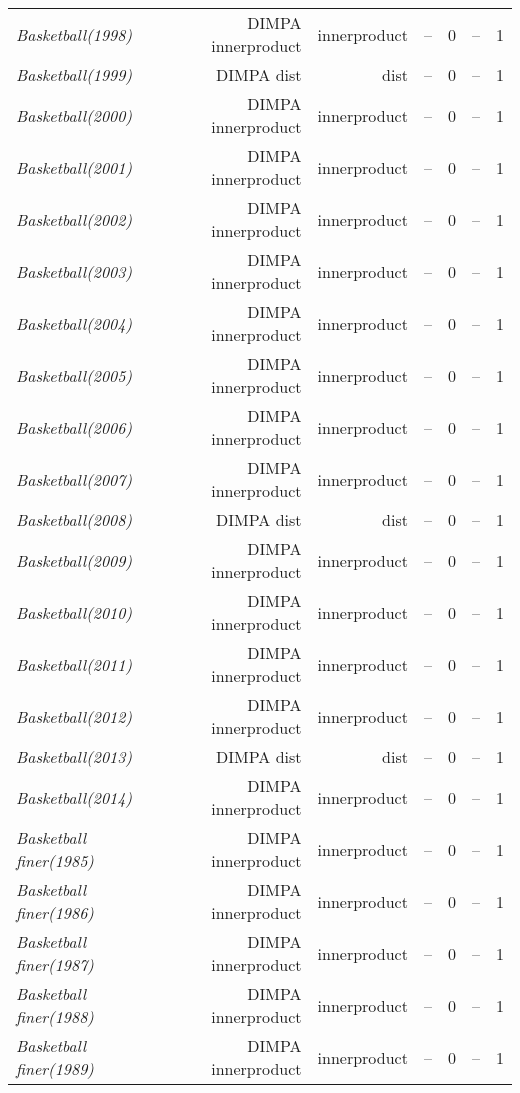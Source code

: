 \documentclass[nohyperref]{article}
\theoremstyle{plain}
\theoremstyle{definition}
\theoremstyle{remark}
\begin{document}
\begin{table*}[!ht]
{\begin{tabular}{lrrrrrr}
			{\it Basketball(1998)} & DIMPA innerproduct & innerproduct & -- & 0 & -- & 1 \\
			{\it Basketball(1999)} & DIMPA dist & dist & -- & 0 & -- & 1 \\
			{\it Basketball(2000)} & DIMPA innerproduct & innerproduct & -- & 0 & -- & 1 \\
			{\it Basketball(2001)} & DIMPA innerproduct & innerproduct & -- & 0 & -- & 1 \\
			{\it Basketball(2002)} & DIMPA innerproduct & innerproduct & -- & 0 & -- & 1 \\
			{\it Basketball(2003)} & DIMPA innerproduct & innerproduct & -- & 0 & -- & 1 \\
			{\it Basketball(2004)} & DIMPA innerproduct & innerproduct & -- & 0 & -- & 1 \\
			{\it Basketball(2005)} & DIMPA innerproduct & innerproduct & -- & 0 & -- & 1 \\
			{\it Basketball(2006)} & DIMPA innerproduct & innerproduct & -- & 0 & -- & 1 \\
			{\it Basketball(2007)} & DIMPA innerproduct & innerproduct & -- & 0 & -- & 1 \\
			{\it Basketball(2008)} & DIMPA dist & dist & -- & 0 & -- & 1 \\
			{\it Basketball(2009)} & DIMPA innerproduct & innerproduct & -- & 0 & -- & 1 \\
			{\it Basketball(2010)} & DIMPA innerproduct & innerproduct & -- & 0 & -- & 1 \\
			{\it Basketball(2011)} & DIMPA innerproduct & innerproduct & -- & 0 & -- & 1 \\
			{\it Basketball(2012)} & DIMPA innerproduct & innerproduct & -- & 0 & -- & 1 \\
			{\it Basketball(2013)} & DIMPA dist & dist & -- & 0 & -- & 1 \\
			{\it Basketball(2014)} & DIMPA innerproduct & innerproduct & -- & 0 & -- & 1 \\
			{\it Basketball finer(1985)} & DIMPA innerproduct & innerproduct & -- & 0 & -- & 1 \\
			{\it Basketball finer(1986)} & DIMPA innerproduct & innerproduct & -- & 0 & -- & 1 \\
			{\it Basketball finer(1987)} & DIMPA innerproduct & innerproduct & -- & 0 & -- & 1 \\
			{\it Basketball finer(1988)} & DIMPA innerproduct & innerproduct & -- & 0 & -- & 1 \\
			{\it Basketball finer(1989)} & DIMPA innerproduct & innerproduct & -- & 0 & -- & 1 \\

\end{tabular}}
\end{table*}
\end{document}
